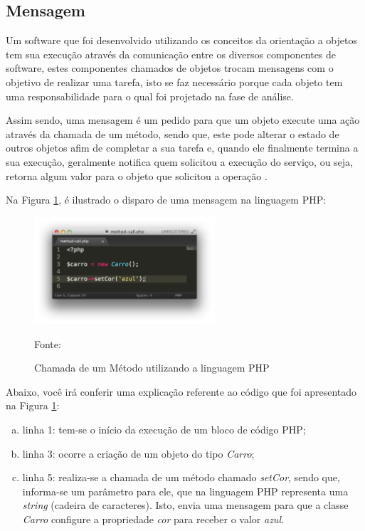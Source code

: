 \subsection{Mensagem}

Um software que foi desenvolvido utilizando os conceitos da orientação a
objetos tem sua execução através da comunicação entre os diversos componentes
de software, estes componentes chamados de objetos trocam mensagens com o
objetivo de realizar uma tarefa, isto se faz necessário porque cada objeto  tem
uma responsabilidade para o qual foi projetado na fase de análise.

Assim sendo, uma mensagem é um pedido para que um objeto execute uma ação
através da chamada de um método, sendo que, este pode alterar o estado de
outros objetos afim de completar a sua tarefa e, quando ele finalmente termina
a sua execução, geralmente notifica quem solicitou a execução do serviço, ou
seja, retorna algum valor para o objeto que solicitou a operação
\cite{c++ComoProgramar}.

Na Figura \ref{fig:mensagem}, é ilustrado o disparo de uma mensagem na linguagem
\acs{PHP}:

\begin{figure}[h!tb]
	\caption{Chamada de um Método utilizando a linguagem PHP}
	\label{fig:mensagem}

	\centering
	\includegraphics[width=0.6\textwidth]{images/method-call.png}

	\centering
	\footnotesize Fonte: \fonteOAutor
\end{figure}

\FloatBarrier 	%

Abaixo, você irá conferir uma explicação referente ao código que foi
apresentado na Figura \ref{fig:mensagem}:

\begin{enumerate}[a)]
    \item linha 1: tem-se o início da execução de um bloco de código
    \acs{PHP};
    \item linha 3: ocorre a criação de um objeto do tipo \textit{Carro};
    \item linha 5: realiza-se a chamada de um método chamado
    \textit{setCor}, sendo que, informa-se um parâmetro para ele, que na
    linguagem \acs{PHP} representa uma \textit{string} (cadeira de caracteres).
    Isto, envia uma mensagem para que a classe \textit{Carro} configure
    a propriedade \textit{cor} para receber o valor \textit{azul}.
\end{enumerate}

